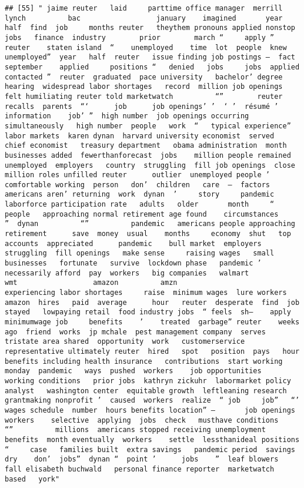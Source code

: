 \documentclass[
]{article}
\begin{document}
\begin{verbatim}
## [55] " jaime reuter   laid     parttime office manager  merrill lynch          bac                  january    imagined       year   half  find  job     months reuter   theythem pronouns applied nonstop   jobs   finance  industry        prior        march “     apply ” reuter    staten island  “    unemployed    time  lot  people  knew    unemployed”  year   half  reuter   issue finding job postings —  fact  september    applied     positions “   denied   jobs     jobs  applied   contacted ”  reuter  graduated  pace university   bachelor’ degree    hearing  widespread labor shortages   record  million job openings felt humiliating reuter told marketwatch          “”        reuter recalls  parents  “‘      job      job openings’ ’  ‘ ’  résumé ’   information    job’ ”  high number  job openings occurring simultaneously   high number  people   work  “   typical experience”  labor markets  karen dynan  harvard university economist  served  chief economist   treasury department   obama administration  month businesses added  fewerthanforecast  jobs    million people remained unemployed  employers   country  struggling  fill job openings  close   million roles unfilled reuter      outlier  unemployed people ’ comfortable working  person   don’  children   care  —  factors        americans aren’ returning  work  dynan  ’     story     pandemic  laborforce participation rate   adults   older       month     “ people   approaching normal retirement age found    circumstances      ”  dynan          “”          pandemic   americans people approaching retirement      save  money  usual    months     economy  shut   top     accounts  appreciated      pandemic    bull market  employers  struggling  fill openings   make sense     raising wages   small businesses   fortunate   survive  lockdown phase   pandemic ’ necessarily afford  pay  workers   big companies   walmart          wmt                  amazon          amzn                    experiencing labor shortages     raise  minimum wages  lure workers   amazon  hires   paid  average      hour   reuter  desperate  find  job  stayed   lowpaying retail  food industry jobs  “ feels  sh—    apply   minimumwage job     benefits    ’    treated  garbage” reuter    weeks ago  friend  works  jp mchale  pest management company  serves  tristate area shared  opportunity  work   customerservice representative ultimately reuter  hired   spot   position  pays   hour    benefits including health insurance   contributions  start working  monday  pandemic   ways  pushed  workers    job opportunities    working conditions   prior jobs  kathryn zickuhr  labormarket policy analyst   washington center  equitable growth  leftleaning research  grantmaking nonprofit ’  caused  workers  realize  “ job     job”   “’ wages schedule  number  hours benefits location” —       job openings  workers    selective  applying  jobs  check   musthave conditions           “”          millions  americans stopped receiving unemployment benefits  month eventually  workers    settle  lessthanideal positions “     case   families built  extra savings   pandemic period  savings    dry    don’  jobs”  dynan “  point ’      jobs    ”  leaf blowers    fall elisabeth buchwald   personal finance reporter  marketwatch   based   york"                               
\end{verbatim}
\end{document}
